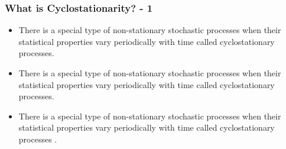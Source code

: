 \documentclass{beamer}
\begin{document}
\begin{frame}
    \frametitle{\textbf{What is Cyclostationarity?} - 1}

    \begin{itemize}
        \item There is a special type of non-stationary stochastic processes when their statistical properties vary periodically with time called cyclostationary processes. 
        \item There is a special type of non-stationary stochastic processes when their statistical properties vary periodically with time called cyclostationary processes. 
        \item There is a special type of non-stationary stochastic processes when their statistical properties vary periodically with time called cyclostationary processes \supercite{sigfridsson}. 
    \end{itemize}
\end{frame}
\end{document}
